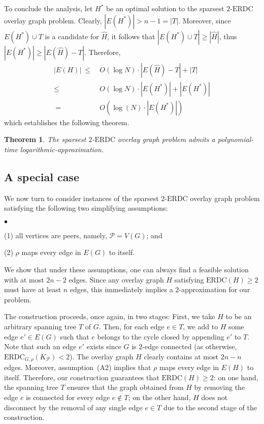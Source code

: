 \LongVersion \documentclass[11pt]{article}
\newtheorem{theorem}{Theorem}[section]
\theoremstyle{definition}
\theoremstyle{plain}
\newcommand{\Vertices}[0]{\mathit{V}}
\newcommand{\Edges}[0]{\mathit{E}}
\newcommand{\Peers}[0]{\mathcal{P}}
\newcommand{\ERDC}[0]{\mathrm{ERDC}}
\newcounter{smallitemizec}
\newenvironment{smallitemize}
{   \setcounter{smallitemizec}{0}
    \vspace{-0.5ex}
  \begin{list}{$\bullet$}
    {\usecounter{smallitemizec}
      \setlength{\parsep}{0pt}
      \setlength{\itemsep}{0pt}}
    }{ \end{list}
   \vspace{-0.5ex}
}
\begin{document}
To conclude the analysis, let $H^{*}$ be an optimal solution to the sparsest
$2$-$\ERDC$ overlay graph problem.
Clearly, $|\Edges(H^{*})| > n - 1 = |T|$.
Moreover, since $\Edges(H^{*}) \cup T$ is a candidate for $\hat{H}$, it
follows that $|\Edges(H^{*}) \cup T| \geq |\hat{H}|$, thus $|\Edges(H^{*})|
\geq |\Edges(\hat{H}) - T|$.
Therefore,
\begin{align*}
|\Edges(H)|
~ \leq & ~
O (\log N) \cdot |\Edges(\hat{H}) - T| + |T| \\
\leq & ~
O (\log N) \cdot |\Edges(H^{*})| + |\Edges(H^{*})| \\
~ = & ~
O (\log(N) \cdot |\Edges(H^{*})|)
\end{align*}
which establishes the following theorem.

\begin{theorem} \label{theorem:ApproximationSparsestERDC}
The sparsest $2$-$\ERDC$ overlay graph problem admits a polynomial-time
logarithmic-approximation.
\end{theorem}

\subsection{A special case}


We now turn to consider instances of the sparsest $2$-$\ERDC$ overlay graph
problem satisfying the following two simplifying assumptions:
\begin{smallitemize}
\item[(1)] all vertices are peers, namely, $\Peers = \Vertices(G)$; and
\item[(2)] $\rho$ maps every edge in $\Edges(G)$ to itself.
\end{smallitemize}
We show that under these assumptions, one can always find a feasible solution
with at most $2 n - 2$ edges.
Since any overlay graph $H$ satisfying $\ERDC(H) \geq 2$ must have at least
$n$ edges, this immediately implies a $2$-approximation for our problem.

\LongVersion The construction proceeds, once again, in two stages:
First, we take $H$ to be an arbitrary spanning tree $T$ of $G$.
Then, for each edge $e \in T$, we add to $H$ some edge $e' \in
\Edges(G)$ such that $e$ belongs to the cycle closed by appending $e'$ to $T$.
Note that such an edge $e'$ exists since $G$ is $2$-edge connected (as
otherwise, $\ERDC_{G, \rho}(K_{\Peers}) < 2$).
The overlay graph $H$ clearly contains at most $2 n - n$ edges.
Moreover, assumption~(A2) implies that $\rho$ maps every edge in $\Edges(H)$
to itself.
Therefore, our construction guarantees that $\ERDC(H) \geq 2$:
on one hand, the spanning tree $T$ ensures that the graph obtained from $H$ by
removing the edge $e$ is connected for every edge $e \notin T$;
on the other hand, $H$ does not disconnect by the removal of any single edge
$e \in T$ due to the second stage of the construction.
\LongVersionEnd 
\end{document}
